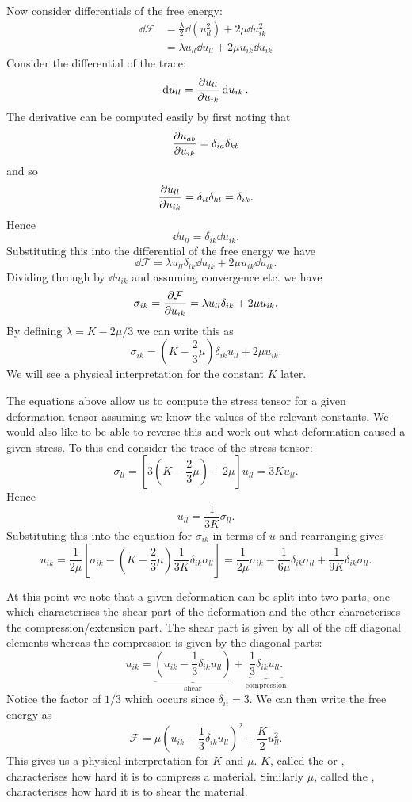 \documentclass[a4paper]{article}
\newcommand{\freeEnergy}{\mathcal{F}}
\begin{document}
    Now consider differentials of the free energy:
    \begin{align*}
        \dd{\freeEnergy} &= \frac{\lambda}{2}\dd{(u_{ll}^2)} + 2\mu\dd{u_{ik}^2}\\
        &= \lambda u_{ll}\dd{u_{ll}} + 2\mu u_{ik}\dd{u_{ik}}
    \end{align*}
    Consider the differential of the trace:
    \[\dd{u_{ll}} = \pdv{u_{ll}}{u_{ik}}\dd{u_{ik}}.\]
    The derivative can be computed easily by first noting that
    \[\pdv{u_{ab}}{u_{ik}} = \delta_{ia}\delta_{kb}\]
    and so
    \[\pdv{u_{ll}}{u_{ik}} = \delta_{il}\delta_{kl} = \delta_{ik}.\]
    Hence
    \[\dd{u_{ll}} = \delta_{ik}\dd{u_{ik}}.\]
    Substituting this into the differential of the free energy we have
    \[\dd{\freeEnergy} = \lambda u_{ll}\delta_{ik}\dd{u_{ik}} + 2\mu u_{ik}\dd{u_{ik}}.\]
    Dividing through by \(\dd{u_{ik}}\) and assuming convergence etc. we have
    \[\sigma_{ik} = \pdv{\freeEnergy}{u_{ik}} = \lambda u_{ll}\delta_{ik} + 2\mu u_{ik}.\]
    By defining \(\lambda = K - 2\mu/3\) we can write this as
    \[\sigma_{ik} = \left( K - \frac{2}{3}\mu \right)\delta_{ik}u_{ll} + 2\mu u_{ik}.\]
    We will see a physical interpretation for the constant \(K\) later.
    
    The equations above allow us to compute the stress tensor for a given deformation tensor assuming we know the values of the relevant constants.
    We would also like to be able to reverse this and work out what deformation caused a given stress.
    To this end consider the trace of the stress tensor:
    \[\sigma_{ll} = \left[ 3\left( K - \frac{2}{3}\mu \right) + 2\mu \right] u_{ll} = 3Ku_{ll}.\]
    Hence
    \[u_{ll} = \frac{1}{3K}\sigma_{ll}.\]
    Substituting this into the equation for \(\sigma_{ik}\) in terms of \(u\) and rearranging gives
    \[u_{ik} = \frac{1}{2\mu}\left[ \sigma_{ik} - \left( K - \frac{2}{3}\mu \right) \frac{1}{3K} \delta_{ik} \sigma_{ll} \right] = \frac{1}{2\mu}\sigma_{ik} - \frac{1}{6\mu}\delta_{ik}\sigma_{ll} + \frac{1}{9K}\delta_{ik}\sigma_{ll}.\]
    
    At this point we note that a given deformation can be split into two parts, one which characterises the shear part of the deformation and the other characterises the compression/extension part.
    The shear part is given by all of the off diagonal elements whereas the compression is given by the diagonal parts:
    \[u_{ik} = \underbrace{\left( u_{ik} - \frac{1}{3}\delta_{ik}u_{ll} \right)}_{\text{shear}} + \underbrace{\frac{1}{3}\delta_{ik}u_{ll}.}_{\text{compression}}\]
    Notice the factor of \(1/3\) which occurs since \(\delta_{ii} = 3\).
    We can then write the free energy as
    \[\freeEnergy = \mu\left( u_{ik} - \frac{1}{3}\delta_{ik}u_{ll} \right)^2 + \frac{K}{2}u_{ll}^2.\]
    This gives us a physical interpretation for \(K\) and \(\mu\).
    \(K\), called the  or , characterises how hard it is to compress a material.
    Similarly \(\mu\), called the , characterises how hard it is to shear the material.
    
\end{document}
